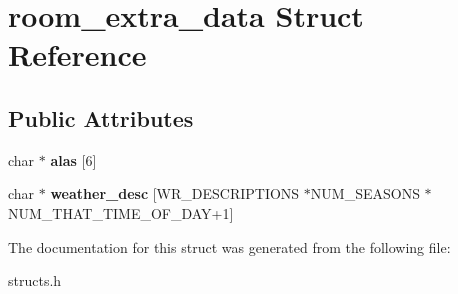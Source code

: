 \hypertarget{structroom__extra__data}{\section{room\-\_\-extra\-\_\-data Struct Reference}
\label{structroom__extra__data}
}
\subsection*{Public Attributes}
\begin{DoxyCompactItemize}
\item 
\hypertarget{structroom__extra__data_a1a5764f5550696ec1368450a51a92760}{char $\ast$ {\bfseries alas} \mbox{[}6\mbox{]}}\label{structroom__extra__data_a1a5764f5550696ec1368450a51a92760}

\item 
\hypertarget{structroom__extra__data_af6726484510068b64b23f62dcb58ccd2}{char $\ast$ {\bfseries weather\-\_\-desc} \mbox{[}W\-R\-\_\-\-D\-E\-S\-C\-R\-I\-P\-T\-I\-O\-N\-S $\ast$N\-U\-M\-\_\-\-S\-E\-A\-S\-O\-N\-S $\ast$N\-U\-M\-\_\-\-T\-H\-A\-T\-\_\-\-T\-I\-M\-E\-\_\-\-O\-F\-\_\-\-D\-A\-Y+1\mbox{]}}\label{structroom__extra__data_af6726484510068b64b23f62dcb58ccd2}

\end{DoxyCompactItemize}


The documentation for this struct was generated from the following file\-:\begin{DoxyCompactItemize}
\item 
structs.\-h\end{DoxyCompactItemize}

